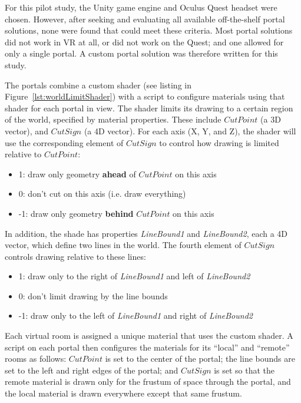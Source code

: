 \documentclass{sigchi}
\begin{document}
For this pilot study, the Unity game engine and Oculus Quest headset were chosen.  However, after seeking and evaluating all available off-the-shelf portal solutions, none were found that could meet these criteria.  Most portal solutions did not work in VR at all, or did not work on the Quest; and one allowed for only a single portal.  A custom portal solution was therefore written for this study.

The portals combine a custom shader (see listing in Figure~\ref{lst:worldLimitShader}) with a script to configure materials using that shader for each portal in view.  The shader limits its drawing to a certain region of the world, specified by material properties.  These include $CutPoint$ (a 3D vector), and $CutSign$ (a 4D vector).  For each axis (X, Y, and Z), the shader will use the corresponding element of $CutSign$ to control how drawing is limited relative to $CutPoint$:

\begin{itemize}
\item 1: draw only geometry \textbf{ahead} of $CutPoint$ on this axis
\item 0: don’t cut on this axis (i.e. draw everything)
\item -1: draw only geometry \textbf{behind} $CutPoint$ on this axis
\end{itemize}

In addition, the shade has properties \textit{LineBound1} and \textit{LineBound2}, each a 4D vector, which define two lines in the world.  The fourth element of $CutSign$ controls drawing relative to these lines:

\begin{itemize}
\item 1: draw only to the right of \textit{LineBound1} and left of \textit{LineBound2}
\item 0: don’t limit drawing by the line bounds
\item -1: draw only to the left of \textit{LineBound1} and right of \textit{LineBound2}
\end{itemize}

Each virtual room is assigned a unique material that uses the custom shader.  A script on each portal then configures the materials for its “local” and “remote” rooms as follows: $CutPoint$ is set to the center of the portal; the line bounds are set to the left and right edges of the portal; and $CutSign$ is set so that the remote material is drawn only for the frustum of space through the portal, and the local material is drawn everywhere except that same frustum.
\end{document}
